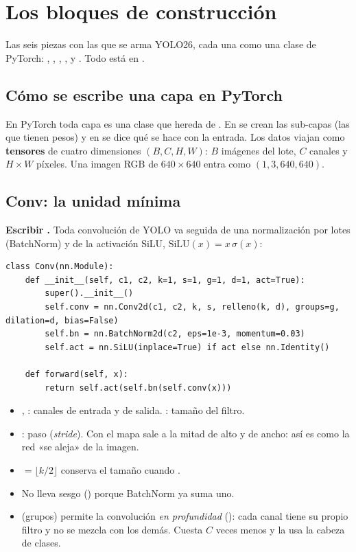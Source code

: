 \chapter{Los bloques de construcción}
\label{cap:bloques}

\begin{enpocas}
Las seis piezas con las que se arma YOLO26, cada una como una clase de PyTorch:
, , , ,  y .
Todo está en .
\end{enpocas}

\section{Cómo se escribe una capa en PyTorch}

En PyTorch toda capa es una clase que hereda de . En
 se crean las sub-capas (las que tienen pesos) y en
 se dice qué se hace con la entrada. Los datos viajan como
\textbf{tensores} de cuatro dimensiones $(B, C, H, W)$: $B$ imágenes del lote,
$C$ canales y $H\times W$ píxeles. Una imagen RGB de $640\times640$ entra como
$(1, 3, 640, 640)$.

\section{Conv: la unidad mínima}

 \textbf{Escribir .}
Toda convolución de YOLO va seguida de una normalización por lotes
(BatchNorm) y de la activación SiLU, $\mathrm{SiLU}(x) = x\,\sigma(x)$:

\begin{lstlisting}[style=py]
class Conv(nn.Module):
    def __init__(self, c1, c2, k=1, s=1, g=1, d=1, act=True):
        super().__init__()
        self.conv = nn.Conv2d(c1, c2, k, s, relleno(k, d), groups=g, dilation=d, bias=False)
        self.bn = nn.BatchNorm2d(c2, eps=1e-3, momentum=0.03)
        self.act = nn.SiLU(inplace=True) if act else nn.Identity()

    def forward(self, x):
        return self.act(self.bn(self.conv(x)))
\end{lstlisting}

\begin{itemize}
  \item {}, : canales de entrada y de salida. : tamaño del filtro.
  \item {}: paso (\emph{stride}). Con  el mapa sale a la mitad de alto
        y de ancho: así es como la red «se aleja» de la imagen.
  \item {} $=\lfloor k/2\rfloor$ conserva el tamaño cuando .
  \item No lleva sesgo () porque BatchNorm ya suma uno.
  \item {} (grupos) permite la convolución \emph{en profundidad}
        (): cada canal tiene su propio filtro y no se mezcla con los demás.
        Cuesta $C$ veces menos y la usa la cabeza de clases.
\end{itemize}

